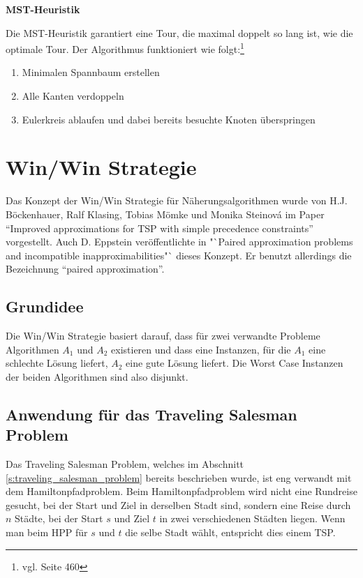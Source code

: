 \documentclass[11pt,a4paper]{article}
\begin{document}
\medskip

\begin{flushleft}
\textbf{MST-Heuristik}

Die MST-Heuristik garantiert eine Tour, die maximal doppelt so lang ist, wie die optimale Tour. Der Algorithmus funktioniert wie folgt:\footnote{vgl. \cite{teschl06} Seite 460}

\begin{enumerate}
    \item Minimalen Spannbaum erstellen
    \item Alle Kanten verdoppeln
    \item Eulerkreis ablaufen und dabei bereits besuchte Knoten überspringen
\end{enumerate}

\end{flushleft}
\newpage
\section{Win/Win Strategie}
Das Konzept der Win/Win Strategie für Näherungsalgorithmen wurde von H.J. Böckenhauer, Ralf Klasing, Tobias Mömke und Monika Steinová im Paper "`Improved approximations for TSP with simple precedence constraints"'\cite{boeckenhauer10} vorgestellt.  Auch D. Eppstein veröffentlichte in "`Paired approximation problems and incompatible inapproximabilities"`\cite{eppstein10} dieses Konzept. Er benutzt allerdings die Bezeichnung "`paired approximation"'.


\subsection{Grundidee}
Die Win/Win Strategie basiert darauf, dass für zwei verwandte Probleme Algorithmen $A_1$ und $A_2$ existieren und dass eine Instanzen, für die $A_1$ eine schlechte Lösung liefert, $A_2$ eine gute Lösung liefert. Die Worst Case Instanzen der beiden Algorithmen sind also disjunkt.

\subsection{Anwendung für das Traveling Salesman Problem}
Das Traveling Salesman Problem, welches im Abschnitt \ref{s:traveling_salesman_problem} bereits beschrieben wurde, ist eng verwandt mit dem Hamiltonpfadproblem. Beim Hamiltonpfadproblem wird nicht eine Rundreise gesucht, bei der Start und Ziel in derselben Stadt sind, sondern eine Reise durch $n$ Städte, bei der Start $s$ und Ziel $t$ in zwei verschiedenen Städten liegen. Wenn man beim HPP für $s$ und $t$ die selbe Stadt wählt, entspricht dies einem TSP.
\end{document}
